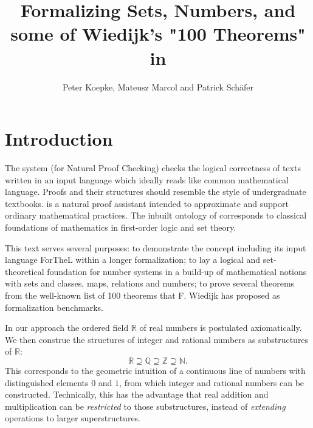 \documentclass{article}
\begin{document}

\newcommand{\Prod}[3]{#1_{#2} \cdots #1_{#3}}
\newcommand{\Seq}[2]{\{#1,\dots,#2\}}
\newcommand{\FinSet}[3]{\{#1_{#2},\dots,#1_{#3}\}}
\newcommand{\Primes}{\mathbb{P}}
\newcommand{\pow}{{\cal P}}
\newcommand{\range}{\operatorname{ran}}
\newcommand{\inv}[1]{#1^{-1}}
\newcommand{\gcdd}{\text{gcdd}}
\newcommand{\sset}[2]{\{#1\}_{#2}}

\title{Formalizing Sets, Numbers, and some of Wiedijk's
"100 Theorems" in \Naproche{}}

\author{Peter Koepke, Mateusz Marcol and Patrick Schäfer}

\maketitle

\tableofcontents
\newpage

\section{Introduction}

The \Naproche{} system (for Natural Proof Checking)
checks the logical correctness of texts
written in an input language which ideally reads
like common mathematical language. Proofs and their 
structures should resemble the
style of undergraduate textbooks. 
\Naproche is a natural proof assistant intended to
approximate and support ordinary mathematical practices.
The inbuilt ontology of \Naproche{} corresponds to classical foundations
of mathematics in first-order logic and set theory.

This text serves several purposes: to demonstrate the 
\Naproche{} concept including its
input language ForTheL within a longer formalization;
to lay a logical and set-theoretical foundation for
number systems in a build-up of mathematical notions
with sets and classes, maps, relations and numbers;
to prove several theorems from the well-known list of 100 theorems
that F. Wiedijk has proposed as formalization benchmarks.
 
In our approach the ordered field $\mathbb{R}$ of real numbers
is postulated axiomatically. We then construe the structures of integer and
rational numbers as substructures of $\mathbb{R}$:
\[ \mathbb{R} \supseteq \mathbb{Q} \supseteq \mathbb{Z}
\supseteq \mathbb{N}. \]
This corresponds to the 
geometric intuition of a continuous line of numbers with
distinguished elements $0$ and $1$, from which integer and rational numbers can
be constructed. Technically, this has the advantage 
that real addition and multiplication
can be {\em restricted} to those substructures, instead of {\em extending} operations
to larger superstructures.
\end{document}

